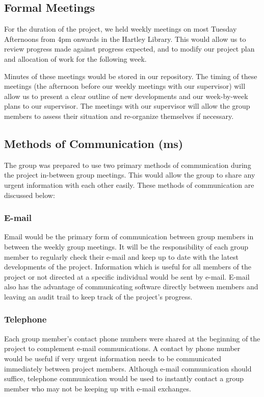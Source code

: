 \subsection{Formal Meetings}

For the duration of the project, we held weekly meetings on most Tuesday 
Afternoons from 4pm onwards in the Hartley Library. This would allow us to 
review progress made against progress expected, and to modify our project 
plan and allocation of work for the following week.

Minutes of these meetings would be stored in our repository.
The timing of these meetings (the afternoon before our weekly meetings with our 
supervisor) will allow us to present a clear outline 
of new developments and our week-by-week plans to our supervisor.
The meetings with our supervisor will allow the group members to assess their situation
and re-organize themselves if necessary.

\subsection{Methods of Communication (ms)}

The group was prepared to use two primary methods of communication during the project
in-between group meetings. This would allow the group to share any urgent information
with each other easily.
These methods of communication are discussed below:

\subsubsection{E-mail}

Email would be the primary form of communication between group members
in between the weekly group meetings. It will be the responsibility of each group
member to regularly check their e-mail and keep up to date with the latest 
developments of the project. Information which is useful for all members of the 
project or not directed at a specific individual would be sent by e-mail. E-mail also 
has the advantage of communicating software directly between members and leaving
an audit trail to keep track of the project's progress.

\subsubsection{Telephone}

Each group member's contact phone numbers were shared at the beginning of the
project to complement e-mail communications. A contact by phone number would
be useful if very urgent information needs to be communicated immediately between
project members. Although e-mail communication should suffice, telephone 
communication would be used to instantly contact a group member who may not
be keeping up with e-mail exchanges.


